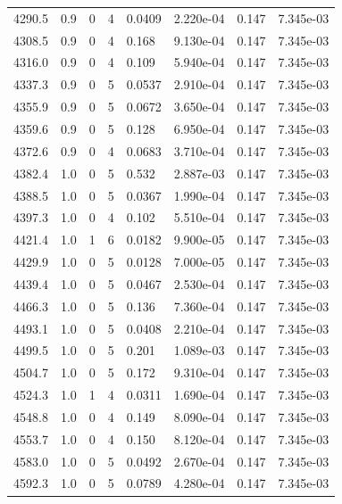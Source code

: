 \documentclass[preview]{standalone}
\begin{document}
{{{{{{{{{{\begin{tabular}{L{1.2cm}C{1.2cm} C{0.3cm}C{0.5cm} C{1.4cm}C{1.4cm} C{1.4cm}C{1.4cm}}
  4290.5  &   0.9  & 0     &  4 &  0.0409  & 2.220e-04  & 0.147 &  7.345e-03   \\ 
  4308.5  &   0.9  & 0     &  4 &  0.168  & 9.130e-04  & 0.147 &  7.345e-03   \\ 
  4316.0  &   0.9  & 0     &  4 &  0.109  & 5.940e-04  & 0.147 &  7.345e-03   \\ 
  4337.3  &   0.9  & 0     &  5 &  0.0537  & 2.910e-04  & 0.147 &  7.345e-03   \\ 
  4355.9  &   0.9  & 0     &  5 &  0.0672  & 3.650e-04  & 0.147 &  7.345e-03   \\ 
  4359.6  &   0.9  & 0     &  5 &  0.128  & 6.950e-04  & 0.147 &  7.345e-03   \\ 
  4372.6  &   0.9  & 0     &  4 &  0.0683  & 3.710e-04  & 0.147 &  7.345e-03   \\ 
  4382.4  &   1.0  & 0     &  5 &  0.532  & 2.887e-03  & 0.147 &  7.345e-03   \\ 
  4388.5  &   1.0  & 0     &  5 &  0.0367  & 1.990e-04  & 0.147 &  7.345e-03   \\ 
  4397.3  &   1.0  & 0     &  4 &  0.102  & 5.510e-04  & 0.147 &  7.345e-03   \\ 
  4421.4  &   1.0  & 1     &  6 &  0.0182  & 9.900e-05  & 0.147 &  7.345e-03   \\ 
  4429.9  &   1.0  & 0     &  5 &  0.0128  & 7.000e-05  & 0.147 &  7.345e-03   \\ 
  4439.4  &   1.0  & 0     &  5 &  0.0467  & 2.530e-04  & 0.147 &  7.345e-03   \\ 
  4466.3  &   1.0  & 0     &  5 &  0.136  & 7.360e-04  & 0.147 &  7.345e-03   \\ 
  4493.1  &   1.0  & 0     &  5 &  0.0408  & 2.210e-04  & 0.147 &  7.345e-03   \\ 
  4499.5  &   1.0  & 0     &  5 &  0.201  & 1.089e-03  & 0.147 &  7.345e-03   \\ 
  4504.7  &   1.0  & 0     &  5 &  0.172  & 9.310e-04  & 0.147 &  7.345e-03   \\ 
  4524.3  &   1.0  & 1     &  4 &  0.0311  & 1.690e-04  & 0.147 &  7.345e-03   \\ 
  4548.8  &   1.0  & 0     &  4 &  0.149  & 8.090e-04  & 0.147 &  7.345e-03   \\ 
  4553.7  &   1.0  & 0     &  4 &  0.150  & 8.120e-04  & 0.147 &  7.345e-03   \\ 
  4583.0  &   1.0  & 0     &  5 &  0.0492  & 2.670e-04  & 0.147 &  7.345e-03   \\ 
  4592.3  &   1.0  & 0     &  5 &  0.0789  & 4.280e-04  & 0.147 &  7.345e-03   \\ 

\end{tabular}}}}}}}}}}}
\end{document}
